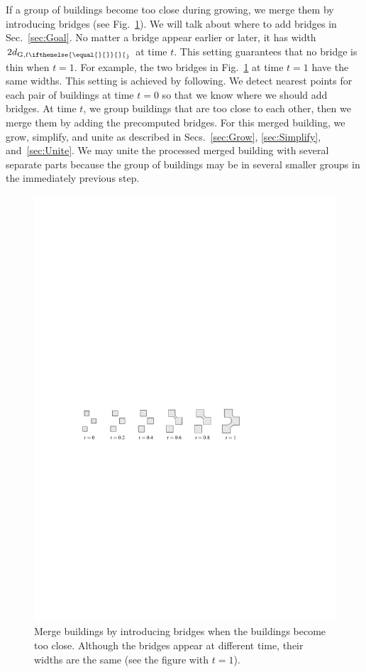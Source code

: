 \documentclass[graybox]{svmult}
\newcommand{\fig}{Fig.~}
\newcommand{\sect}{Sec.~}
\newcommand{\sects}{Secs.~}
\newcommand{\dtrm}[2][]{d_{\mathrm{#2}, t\ifthenelse{\equal{#1}{}}{}{_#1}}}
\begin{document}
If a group of buildings become too close during growing,
we merge them by introducing bridges (see \fig\ref{fig:GrowAndBridge}).
We will talk about where to add bridges in \sect\ref{sec:Goal}.
No matter a bridge appear earlier or later, 
it has width $2\dtrm{G}$ at time $t$.
This setting guarantees that no bridge is thin when $t=1$.
For example, the two bridges in \fig\ref{fig:GrowAndBridge} at time $t=1$ have 
the same widths.
This setting is achieved by following.
We detect nearest points for each pair of buildings at time $t=0$ so that 
we know where we should add bridges.
At time $t$, we group buildings that are too close to each other,
then we merge them by adding the precomputed bridges.
For this merged building, we grow, simplify, and unite as described in 
\sects\ref{sec:Grow}, \ref{sec:Simplify}, and~\ref{sec:Unite}.
We may unite the processed merged building with several separate parts 
because the group of buildings may be in several smaller groups
in the immediately previous step.



\begin{figure}[tb]
	\centering
	\includegraphics[draft=false]{GrowAndBridge}
	\caption{Merge buildings by introducing bridges when the buildings become 
		too close.
		Although the bridges appear at different time, 
		their widths are the same (see the figure with $t=1$).}
	\label{fig:GrowAndBridge}
\end{figure}
\end{document}
